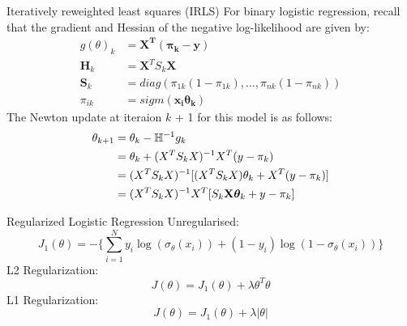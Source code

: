 \documentclass{beamer}
\begin{document}
\begin{frame}{Iteratively reweighted least squares (IRLS)}
For binary logistic regression, recall that the gradient and Hessian of the negative log-likelihood are given by:
\begin{align*}
g(\theta)_{k} &= \mathbf{X^{T}(\pi_{k} - y)} \\
\mathbf{H}_{k} &= \mathbf{X}^{T}S_{k}\mathbf{X} \\
\mathbf{S}_{k} &= diag(\pi_{1k}(1 - \pi_{1k}), \ldots, \pi_{nk}(1 - \pi_{nk})) \\
\pi_{ik} &= sigm(\mathbf{x_{i}\theta_{k}})
\end{align*}
The Newton update at iteraion $k$ + 1 for this model is as follows:
\begin{align*}
\theta_{k+1} &= \theta_{k} - \mathbb{H}^{-1}g_{k} \\
&= \theta_{k} + (X^{T}S_{k}X)^{-1}X^{T}(y - \pi_{k}) \\
&= (X^{T}S_{k}X)^{-1}[(X^{T}S_{k}X)\theta_{k} + X^{T}(y - \pi_{k})] \\
&= (X^{T}S_{k}X)^{-1}X^{T}[S_{k}\mathbf{X}\boldsymbol{\theta}_{k} + y - \pi_{k}]
\end{align*}
\end{frame}
\begin{frame}{Regularized Logistic Regression}
Unregularised:
\begin{equation*}
J_{1}(\theta) = -\bigg\{\sum_{i=1}^{N}y_{i}\log(\sigma_{\theta}(x_{i})) + (1 - y_{i})\log(1 - \sigma_{\theta}(x_{i}))\bigg\}
\end{equation*}
L2 Regularization:
\begin{equation*}
J(\theta) = J_{1}(\theta) + \lambda\theta^{T}\theta
\end{equation*}
L1 Regularization:
\begin{equation*}
J(\theta) = J_{1}(\theta) + \lambda|\theta|
\end{equation*}
\end{frame}
\end{document}
